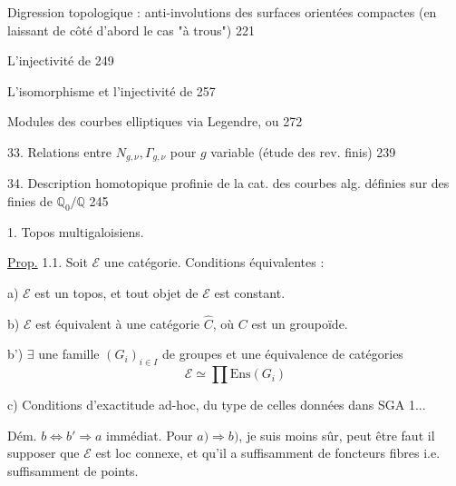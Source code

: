 Digression topologique : anti-involutions des surfaces
orientées compactes (en laissant de côté d'abord le cas "à trous")
\hfill 221

 L'injectivité de
\hfill 249

 L'isomorphisme
et l'injectivité de
\hfill 257

 Modules des courbes elliptiques via Legendre, ou
 \hfill 272

33. Relations entre \(N_{g,\nu},\Gamma_{g,\nu}\) pour \(g\)
variable (étude des rev. finis) \hfill 239

34. Description homotopique profinie de la cat. des courbes alg.
définies sur des 
 finies de \(\mathbb Q_0/\mathbb Q\)
\hfill 245


1. Topos multigaloisiens.

\uline{Prop.} 1.1. Soit \(\mathcal E\) une catégorie.
Conditions équivalentes :

a) \(\mathcal E\) est un topos, et tout objet de \(\mathcal E\)
est  constant.

b) \(\mathcal E\) est équivalent à une catégorie \(\widehat C\),
où \(C\) est un groupoïde.


b') \(\exists\) une famille \((G_i)_{i\in I}\) de groupes
et une équivalence de catégories
\[
\mathcal E\simeq\prod\mathrm{Ens}(G_i)
\]

c) Conditions d'exactitude ad-hoc, du type de celles données dans SGA 1...

Dém. \(b\Longleftrightarrow b'\Longrightarrow a\) immédiat.
Pour \(a)\Longrightarrow b)\), je suis moins sûr, peut être faut il
supposer que \(\mathcal E\) est loc connexe, et qu'il a suffisamment
de foncteurs fibres i.e. suffisamment de points.

